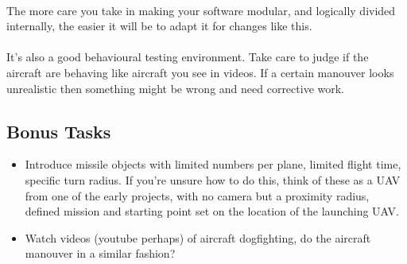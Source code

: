 \documentclass[11pt]{book}
\begin{document}
\paragraph{} The more care you take in making your software modular, and
logically divided internally, the easier it will be to adapt it for changes
like this.

\paragraph{} It's also a good behavioural testing environment. Take care to
judge if the aircraft are behaving like aircraft you see in videos. If a
certain manouver looks unrealistic then something might be wrong and need
corrective work. 

\subsection{Bonus Tasks}

\begin{itemize}
\item Introduce missile objects with limited numbers per plane, limited flight time, specific turn radius. If you're unsure how to do this, think of these as a UAV from one of the early projects, with no camera but a proximity radius, defined mission and starting point set on the location of the launching UAV.
\item Watch videos (youtube perhaps) of aircraft dogfighting, do the aircraft manouver in a similar fashion?
\end{itemize}

\clearpage
\end{document}
